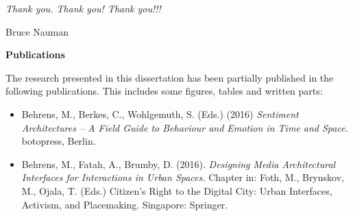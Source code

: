 \begin{acknowledgements}
\textit{Thank you. Thank you! Thank you!!!}

Bruce Nauman
\newpage

\listoftodos



\newpage


\textbf{Publications}

\begin{singlespace}{
The research presented in this dissertation has been partially published in the following publications. This includes some figures, tables and written parts:

\begin{itemize} 


\item Behrens, M., Berkes, C., Wohlgemuth, S. (Eds.) (2016) \textit{Sentiment Architectures – A Field Guide to Behaviour and Emotion in Time and Space.} botopress, Berlin.
\item Behrens, M., Fatah, A., Brumby, D. (2016). \textit{Designing Media Architectural Interfaces for Interactions in Urban Spaces.} Chapter in: Foth, M., Brynskov, M., Ojala, T. (Eds.) Citizen’s Right to the Digital City: Urban Interfaces, Activism, and Placemaking. Singapore: Springer.


\end{itemize}}
\end{singlespace}
\end{acknowledgements}
